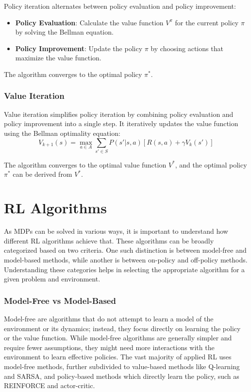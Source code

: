 Policy iteration alternates between policy evaluation and policy improvement:
\begin{itemize}
    \item \textbf{Policy Evaluation}: Calculate the value function $V^{\pi}$ for the current policy $\pi$ by solving the Bellman equation.
    \item \textbf{Policy Improvement}: Update the policy $\pi$ by choosing actions that maximize the value function.
\end{itemize}

The algorithm converges to the optimal policy $\pi^*$.

\subsubsection{Value Iteration}

Value iteration simplifies policy iteration by combining policy evaluation and policy improvement into a single step.
It iteratively updates the value function using the Bellman optimality equation:
\[
V_{k+1}(s) = \max_{a \in A} \sum_{s' \in S} P(s'|s,a) \left[ R(s,a) + \gamma V_k(s') \right]
\]

The algorithm converges to the optimal value function $V^*$, and the optimal policy $\pi^*$ can be derived from $V^*$.


\section{RL Algorithms}

As \gls{MDP}s can be solved in various ways, it is important to understand how different \gls{RL} algorithms achieve that.
These algorithms can be broadly categorized based on two criteria.
One such distinction is between model-free and model-based methods, while another is between on-policy and off-policy methods. Understanding these categories helps in selecting the appropriate algorithm for a given problem and environment.

\subsubsection{Model-Free vs Model-Based}

Model-free are algorithms that do not attempt to learn a model of the environment or its dynamics; instead, they focus directly on learning the policy or the value function.
While model-free algorithms are generally simpler and require fewer assumptions, they might need more interactions with the environment to learn effective policies.
The vast majority of applied RL uses model-free methods, further subdivided to value-based methods like Q-learning and SARSA, and policy-based methods which directly learn the policy, such as REINFORCE and actor-critic.

